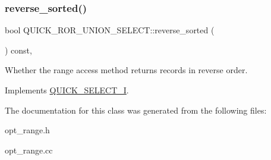 \subsubsection{\texorpdfstring{reverse\+\_\+sorted()}{reverse\_sorted()}}
{\footnotesize\ttfamily bool Q\+U\+I\+C\+K\+\_\+\+R\+O\+R\+\_\+\+U\+N\+I\+O\+N\+\_\+\+S\+E\+L\+E\+C\+T\+::reverse\+\_\+sorted (\begin{DoxyParamCaption}{ }\end{DoxyParamCaption}) const\hspace{0.3cm}{\ttfamily [inline]}, {\ttfamily [virtual]}}

Whether the range access method returns records in reverse order. 

Implements \mbox{\hyperlink{classQUICK__SELECT__I_a686e8770fe10ac41bafdcf6d0c74dff3}{Q\+U\+I\+C\+K\+\_\+\+S\+E\+L\+E\+C\+T\+\_\+I}}.



The documentation for this class was generated from the following files\+:\begin{DoxyCompactItemize}
\item 
opt\+\_\+range.\+h\item 
opt\+\_\+range.\+cc\end{DoxyCompactItemize}
